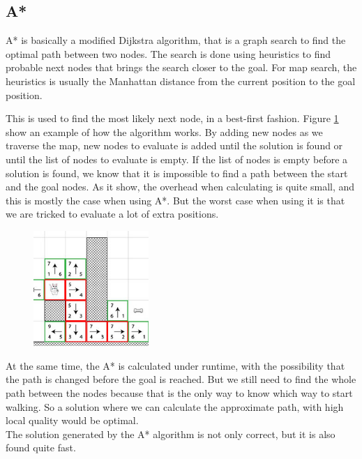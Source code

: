 \documentclass[12 pt]{article} %
\begin{document}
\subsection{A*}
A* is basically a modified Dijkstra algorithm, that is a graph search to find the optimal path between two nodes. 
The search is done using heuristics to find probable next nodes that brings the search closer to the goal. 
For map search, the heuristics is usually the Manhattan distance from the current position to the goal position.

This is used to find the most likely next node, in a best-first fashion.
Figure \ref{fig:astarcat} show an example of how the algorithm works.
By adding new nodes as we traverse the map, new nodes to evaluate is added until the solution is found or until the list of nodes to evaluate is empty.
If the list of nodes is empty before a solution is found, we know that it is impossible to find a path between the start and the goal nodes.
As it show, the overhead when calculating is quite small, and this is mostly the case when using A*.
But the worst case when using it is that we are tricked to evaluate a lot of extra positions.
\begin{figure}
	{\includegraphics[width=0.39\textwidth]{fig/astarcat.jpg}}
	\label{fig:astarcat}
\end{figure}
At the same time, the A* is calculated under runtime, with the possibility that the path is changed before the goal is reached.
But we still need to find the whole path between the nodes because that is the only way to know which way to start walking.
So a solution where we can calculate the approximate path, with high local quality would be optimal.\\

The solution generated by the A* algorithm is not only correct, but it is also found quite fast. 
\end{document}
